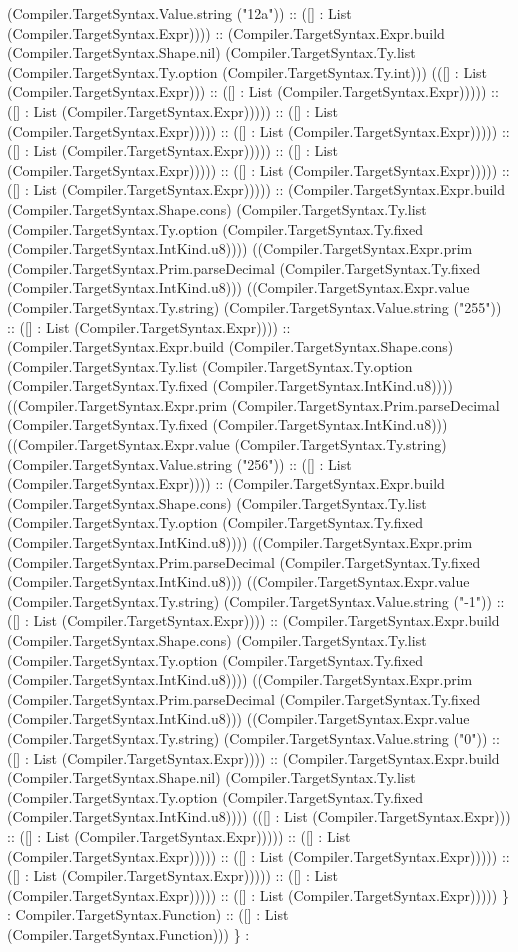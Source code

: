 \documentclass[11pt]{article}
\begin{document}
(Compiler.TargetSyntax.Value.string ("12a")) :: ([] : List (Compiler.TargetSyntax.Expr)))) :: (Compiler.TargetSyntax.Expr.build (Compiler.TargetSyntax.Shape.nil) (Compiler.TargetSyntax.Ty.list (Compiler.TargetSyntax.Ty.option (Compiler.TargetSyntax.Ty.int))) (([] : List (Compiler.TargetSyntax.Expr))) :: ([] : List (Compiler.TargetSyntax.Expr))))) :: ([] : List (Compiler.TargetSyntax.Expr))))) :: ([] : List (Compiler.TargetSyntax.Expr))))) :: ([] : List (Compiler.TargetSyntax.Expr))))) :: ([] : List (Compiler.TargetSyntax.Expr))))) :: ([] : List (Compiler.TargetSyntax.Expr))))) :: ([] : List (Compiler.TargetSyntax.Expr))))) :: ([] : List (Compiler.TargetSyntax.Expr))))) :: (Compiler.TargetSyntax.Expr.build (Compiler.TargetSyntax.Shape.cons) (Compiler.TargetSyntax.Ty.list (Compiler.TargetSyntax.Ty.option (Compiler.TargetSyntax.Ty.fixed (Compiler.TargetSyntax.IntKind.u8)))) ((Compiler.TargetSyntax.Expr.prim (Compiler.TargetSyntax.Prim.parseDecimal (Compiler.TargetSyntax.Ty.fixed (Compiler.TargetSyntax.IntKind.u8))) ((Compiler.TargetSyntax.Expr.value (Compiler.TargetSyntax.Ty.string) (Compiler.TargetSyntax.Value.string ("255")) :: ([] : List (Compiler.TargetSyntax.Expr)))) :: (Compiler.TargetSyntax.Expr.build (Compiler.TargetSyntax.Shape.cons) (Compiler.TargetSyntax.Ty.list (Compiler.TargetSyntax.Ty.option (Compiler.TargetSyntax.Ty.fixed (Compiler.TargetSyntax.IntKind.u8)))) ((Compiler.TargetSyntax.Expr.prim (Compiler.TargetSyntax.Prim.parseDecimal (Compiler.TargetSyntax.Ty.fixed (Compiler.TargetSyntax.IntKind.u8))) ((Compiler.TargetSyntax.Expr.value (Compiler.TargetSyntax.Ty.string) (Compiler.TargetSyntax.Value.string ("256")) :: ([] : List (Compiler.TargetSyntax.Expr)))) :: (Compiler.TargetSyntax.Expr.build (Compiler.TargetSyntax.Shape.cons) (Compiler.TargetSyntax.Ty.list (Compiler.TargetSyntax.Ty.option (Compiler.TargetSyntax.Ty.fixed (Compiler.TargetSyntax.IntKind.u8)))) ((Compiler.TargetSyntax.Expr.prim (Compiler.TargetSyntax.Prim.parseDecimal (Compiler.TargetSyntax.Ty.fixed (Compiler.TargetSyntax.IntKind.u8))) ((Compiler.TargetSyntax.Expr.value (Compiler.TargetSyntax.Ty.string) (Compiler.TargetSyntax.Value.string ("-1")) :: ([] : List (Compiler.TargetSyntax.Expr)))) :: (Compiler.TargetSyntax.Expr.build (Compiler.TargetSyntax.Shape.cons) (Compiler.TargetSyntax.Ty.list (Compiler.TargetSyntax.Ty.option (Compiler.TargetSyntax.Ty.fixed (Compiler.TargetSyntax.IntKind.u8)))) ((Compiler.TargetSyntax.Expr.prim (Compiler.TargetSyntax.Prim.parseDecimal (Compiler.TargetSyntax.Ty.fixed (Compiler.TargetSyntax.IntKind.u8))) ((Compiler.TargetSyntax.Expr.value (Compiler.TargetSyntax.Ty.string) (Compiler.TargetSyntax.Value.string ("0")) :: ([] : List (Compiler.TargetSyntax.Expr)))) :: (Compiler.TargetSyntax.Expr.build (Compiler.TargetSyntax.Shape.nil) (Compiler.TargetSyntax.Ty.list (Compiler.TargetSyntax.Ty.option (Compiler.TargetSyntax.Ty.fixed (Compiler.TargetSyntax.IntKind.u8)))) (([] : List (Compiler.TargetSyntax.Expr))) :: ([] : List (Compiler.TargetSyntax.Expr))))) :: ([] : List (Compiler.TargetSyntax.Expr))))) :: ([] : List (Compiler.TargetSyntax.Expr))))) :: ([] : List (Compiler.TargetSyntax.Expr))))) :: ([] : List (Compiler.TargetSyntax.Expr))))) :: ([] : List (Compiler.TargetSyntax.Expr))))) \} : Compiler.TargetSyntax.Function) :: ([] : List (Compiler.TargetSyntax.Function))) \} : 
\end{document}
